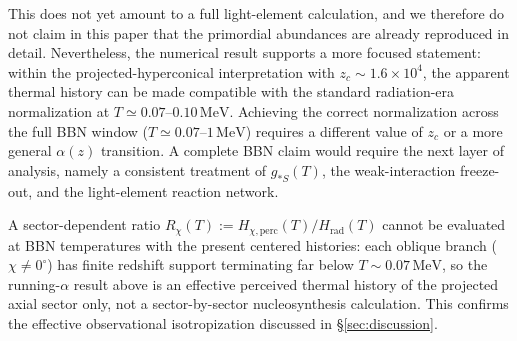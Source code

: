 \documentclass[3p,times,twocolumn]{elsarticle}
\begin{document}
This does not yet amount to a full light-element calculation, and we therefore do not claim in this paper that the primordial abundances are already reproduced in detail. Nevertheless, the numerical result supports a more focused statement: within the projected-hyperconical interpretation with $z_c\sim1.6\times10^4$, the apparent thermal history can be made compatible with the standard radiation-era normalization at $T\simeq0.07$--$0.10\,\mathrm{MeV}$. Achieving the correct normalization across the full BBN window ($T\simeq0.07$--$1\,\mathrm{MeV}$) requires a different value of $z_c$ or a more general $\alpha(z)$ transition. A complete BBN claim would require the next layer of analysis, namely a consistent treatment of $g_{*S}(T)$, the weak-interaction freeze-out, and the light-element reaction network.

A sector-dependent ratio $R_\chi(T):=H_{\chi,\mathrm{perc}}(T)/H_{\mathrm{rad}}(T)$ cannot be evaluated at BBN temperatures with the present centered histories: each oblique branch ($\chi\neq0^\circ$) has finite redshift support terminating far below $T\sim0.07\,\mathrm{MeV}$, so the running-$\alpha$ result above is an effective perceived thermal history of the projected axial sector only, not a sector-by-sector nucleosynthesis calculation. This confirms the effective observational isotropization discussed in \S\ref{sec:discussion}.
\end{document}
